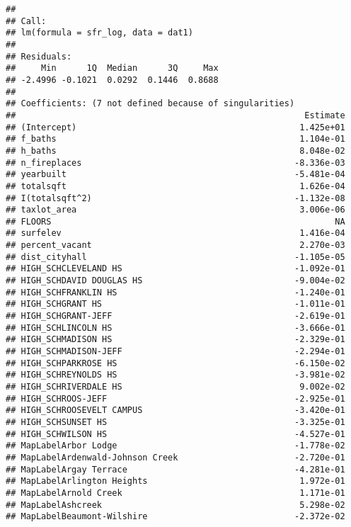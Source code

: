 \documentclass[]{article}
\begin{document}
\begin{verbatim}
## 
## Call:
## lm(formula = sfr_log, data = dat1)
## 
## Residuals:
##     Min      1Q  Median      3Q     Max 
## -2.4996 -0.1021  0.0292  0.1446  0.8688 
## 
## Coefficients: (7 not defined because of singularities)
##                                                         Estimate
## (Intercept)                                            1.425e+01
## f_baths                                                1.104e-01
## h_baths                                                8.048e-02
## n_fireplaces                                          -8.336e-03
## yearbuilt                                             -5.481e-04
## totalsqft                                              1.626e-04
## I(totalsqft^2)                                        -1.132e-08
## taxlot_area                                            3.006e-06
## FLOORS                                                        NA
## surfelev                                               1.416e-04
## percent_vacant                                         2.270e-03
## dist_cityhall                                         -1.105e-05
## HIGH_SCHCLEVELAND HS                                  -1.092e-01
## HIGH_SCHDAVID DOUGLAS HS                              -9.004e-02
## HIGH_SCHFRANKLIN HS                                   -1.240e-01
## HIGH_SCHGRANT HS                                      -1.011e-01
## HIGH_SCHGRANT-JEFF                                    -2.619e-01
## HIGH_SCHLINCOLN HS                                    -3.666e-01
## HIGH_SCHMADISON HS                                    -2.329e-01
## HIGH_SCHMADISON-JEFF                                  -2.294e-01
## HIGH_SCHPARKROSE HS                                   -6.150e-02
## HIGH_SCHREYNOLDS HS                                   -3.981e-02
## HIGH_SCHRIVERDALE HS                                   9.002e-02
## HIGH_SCHROOS-JEFF                                     -2.925e-01
## HIGH_SCHROOSEVELT CAMPUS                              -3.420e-01
## HIGH_SCHSUNSET HS                                     -3.325e-01
## HIGH_SCHWILSON HS                                     -4.527e-01
## MapLabelArbor Lodge                                   -1.778e-02
## MapLabelArdenwald-Johnson Creek                       -2.720e-01
## MapLabelArgay Terrace                                 -4.281e-01
## MapLabelArlington Heights                              1.972e-01
## MapLabelArnold Creek                                   1.171e-01
## MapLabelAshcreek                                       5.298e-02
## MapLabelBeaumont-Wilshire                             -2.372e-02

\end{verbatim}
\end{document}
